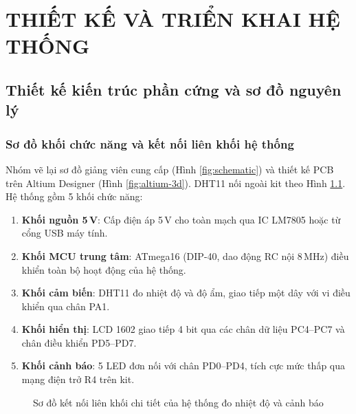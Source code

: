 \chapter{THIẾT KẾ VÀ TRIỂN KHAI HỆ THỐNG}
\begingroup
{}
\setlength{\parskip}{4pt}

\section{Thiết kế kiến trúc phần cứng và sơ đồ nguyên lý}

\subsection{Sơ đồ khối chức năng và kết nối liên khối hệ thống}

Nhóm vẽ lại sơ đồ giảng viên cung cấp (Hình \ref{fig:schematic}) \cite{hust-kit-manual} và thiết kế PCB trên Altium Designer (Hình \ref{fig:altium-3d}). DHT11 nối ngoài kit theo Hình \ref{fig:system-wiring}. Hệ thống gồm 5 khối chức năng:
\begin{enumerate}[leftmargin=1.2cm, topsep=0pt, itemsep=0.5pt, parsep=0pt]
    \item \textbf{Khối nguồn 5\,V}: Cấp điện áp 5\,V cho toàn mạch qua IC LM7805 hoặc từ cổng USB máy tính.
    \item \textbf{Khối MCU trung tâm}: ATmega16 (DIP-40, dao động RC nội 8\,MHz) điều khiển toàn bộ hoạt động của hệ thống.
    \item \textbf{Khối cảm biến}: DHT11 đo nhiệt độ và độ ẩm, giao tiếp một dây với vi điều khiển qua chân PA1.
    \item \textbf{Khối hiển thị}: LCD 1602 giao tiếp 4 bit qua các chân dữ liệu PC4--PC7 và chân điều khiển PD5--PD7.
    \item \textbf{Khối cảnh báo}: 5 LED đơn nối với chân PD0--PD4, tích cực mức thấp qua mạng điện trở R4 trên kit.
\end{enumerate}

\begin{figure}[H]\vspace{-0.25cm}
    \centering
    \vspace{-0.2cm}
    \caption{Sơ đồ kết nối liên khối chi tiết của hệ thống đo nhiệt độ và cảnh báo}
    \label{fig:system-wiring}
\end{figure}

